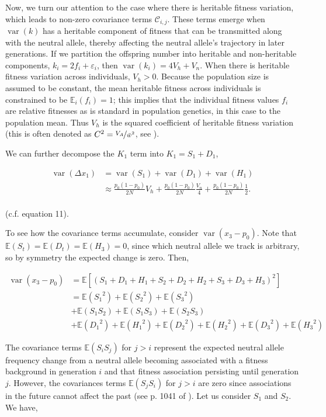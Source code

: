 \documentclass[11pt]{article}
\newcommand{\E}{\mathbb{E}}
\DeclareMathOperator{\var}{var}
\begin{document}
Now, we turn our attention to the case where there is heritable fitness
variation, which leads to non-zero covariance terms $\mathcal{C}_{i,j}$. These
terms emerge when $\var(k)$ has a heritable component of fitness that can be
transmitted along with the neutral allele, thereby affecting the neutral
allele's trajectory in later generations. If we partition the offspring number
into heritable and non-heritable components, $k_i = 2f_i + \varepsilon_i$, then
$\var(k_i) = 4 V_h + V_n$. When there is heritable fitness variation across
individuals, $V_h > 0$. Because the population size is assumed to be constant,
the mean heritable fitness across individuals is constrained to be $\E_i(f_i) =
1$; this implies that the individual fitness values $f_i$ are relative
fitnesses as is standard in population genetics, in this case to the population
mean. Thus $V_h$ is the squared coefficient of heritable fitness variation
(this is often denoted as $C^2 = \nicefrac{V_A}{\bar{w}^2}$, see
\cite{Crow1958-pc,Charlesworth1987-ab,Houle1992-ur}).

We can further decompose the $K_1$ term into $K_1 = S_1 + D_1$,

\begin{align}
  \var(\Delta x_1) &= \var(S_1) + \var(D_1) + \var(H_1) \\
  &\approx \frac{p_0(1-p_0)}{2N} V_h + \frac{p_0(1-p_0)}{2N} \frac{V_n}{4} + \frac{p_0(1-p_0)}{2N} \frac{1}{2}. \\
\end{align}

(c.f. \cite{Santiago1995-hx} equation 11).

To see how the covariance terms accumulate, consider $\var(x_3 - p_0)$. Note
that $\E(S_t) = \E(D_t) = \E(H_3) = 0$, since which neutral allele we track is
arbitrary, so by symmetry the expected change is zero. Then,

\begin{align}
  \label{eq:var_x}
  \var(x_3 - p_0) &= \E\left[ \left(S_1 + D_1 + H_1 + S_2 + D_2 + H_2 + S_3 + D_3 + H_3 \right)^2 \right] \\
                  &= \E({S_1}^2) + \E({S_2}^2) + \E({S_3}^2)  \\
                  &+ \E(S_1 S_2) + \E(S_1 S_3) + \E(S_2 S_3) \\
                  &+ \E({D_1}^2) + \E({H_1}^2) + \E({D_2}^2) + \E({H_2}^2) + \E({D_3}^2) + \E({H_3}^2)
\end{align}

The covariance terms $\E(S_i S_j)$ for $j > i$ represent the expected neutral
allele frequency change from a neutral allele becoming associated with a
fitness background in generation $i$ and that fitness association persisting
until generation $j$. However, the covariances terms $\E(S_j S_i)$ for $j > i$
are zero since associations in the future cannot affect the past (see p. 1041
of \cite{Buffalo2019-qs}). Let us consider $S_1$ and $S_2$. We have,
\end{document}
